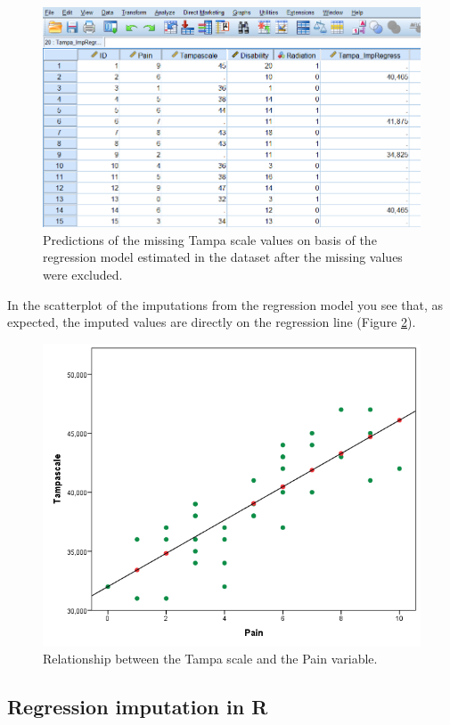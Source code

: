 \documentclass[
]{book}
\begin{document}
\begin{figure}

{\centering \includegraphics[width=0.7\linewidth]{images/fig3.15} 

}

\caption{Predictions of the missing Tampa scale values on basis of the regression model estimated in the dataset after the missing values were excluded.}\label{fig:fig3-15}
\end{figure}

In the scatterplot of the imputations from the regression model you see that, as expected, the imputed values are directly on the regression line (Figure \ref{fig:fig3-16}).

\begin{figure}

{\centering \includegraphics[width=0.7\linewidth]{images/fig3.16} 

}

\caption{Relationship between the Tampa scale and the Pain variable.}\label{fig:fig3-16}
\end{figure}

\hypertarget{regression-imputation-in-r}{%
\subsection{Regression imputation in R}\label{regression-imputation-in-r}}
\end{document}
